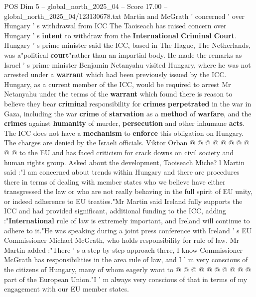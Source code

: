 \begin{textsample}{POS Dim 5 – global\_north\_2025\_04 – Score 17.00 – global\_north\_2025\_04/123130678.txt}  \label{ex:f5_pos_105}
Martin and McGrath ' concerned ' over Hungary ' s withdrawal from ICC The Taoiseach has raised concern over Hungary ' s \textbf{intent} to withdraw from the \textbf{International} \textbf{Criminal} \textbf{Court}.
Hungary ' s prime minister said the ICC, based in The Hague, The Netherlands, was a"political \textbf{court}"rather than an impartial body.
He made the remarks as Israel ' s prime minister Benjamin Netanyahu visited Hungary, where he was not arrested under a \textbf{warrant} which had been previously issued by the ICC.
Hungary, as a current member of the ICC, would be required to arrest Mr Netanyahu under the terms of the \textbf{warrant} which found there is reason to believe they bear \textbf{criminal} responsibility for \textbf{crimes} \textbf{perpetrated} in the war in Gaza, including the war \textbf{crime} of \textbf{starvation} as a \textbf{method} of \textbf{warfare}, and the \textbf{crimes} against \textbf{humanity} of murder, \textbf{persecution} and other inhumane \textbf{acts}.
The ICC does not have a \textbf{mechanism} to \textbf{enforce} this obligation on Hungary.
The charges are denied by the Israeli officials.
Viktor Orban @ @ @ @ @ @ @ @ @ @ to the EU and has faced criticism for crack downs on civil society and human rights group.
Asked about the development, Taoiseach Miche? l Martin said :"I am concerned about trends within Hungary and there are procedures there in terms of dealing with member states who we believe have either transgressed the law or who are not really behaving in the full spirit of EU unity, or indeed adherence to EU treaties."Mr Martin said Ireland fully supports the ICC and had provided significant, additional funding to the ICC, adding :"\textbf{International} rule of law is extremely important, and Ireland will continue to adhere to it."He was speaking during a joint press conference with Ireland ' s EU Commissioner Michael McGrath, who holds responsibility for rule of law.
Mr Martin added :"There ' s a step-by-step approach there, I know Commissioner McGrath has responsibilities in the area rule of law, and I ' m very conscious of the citizens of Hungary, many of whom eagerly want to @ @ @ @ @ @ @ @ @ @ part of the European Union."I ' m always very conscious of that in terms of my engagement with our EU member states.

\end{textsample}
